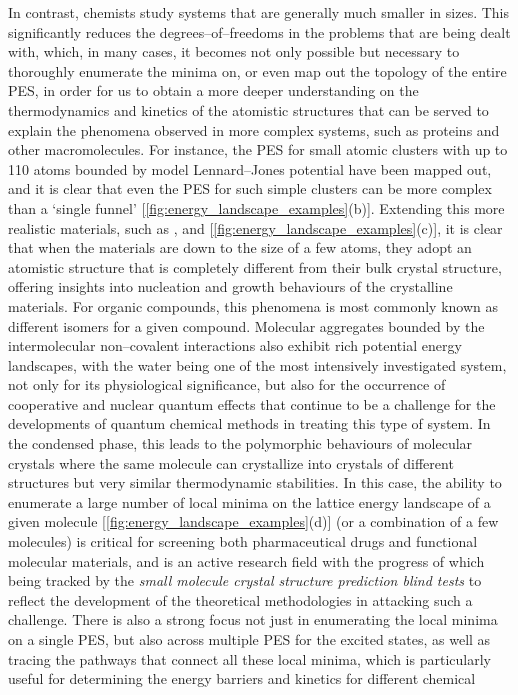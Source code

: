 In contrast, chemists study  systems that are generally much smaller in sizes. This significantly reduces the degrees--of--freedoms in the problems that are being dealt with, which, in many cases, it becomes not only possible but necessary to thoroughly enumerate the minima on, or even map out the topology of the entire PES, in order for us to obtain a more deeper understanding on the thermodynamics and kinetics of the atomistic structures that can be served to explain the phenomena observed in more complex systems, such as proteins and other macromolecules. For instance, the PES for small atomic clusters with up to 110 atoms  bounded by model Lennard--Jones potential have been mapped out,\cite{wales1997global} and it is clear that even the PES for such simple clusters can be more complex than a `single funnel' [\cref{fig:energy_landscape_examples}(b)].\cite{doye1999evolution} Extending this more realistic materials, such as \cite{roberts2001investigation}, \cite{hamad2005structure} and \cite{al2008structures} [\cref{fig:energy_landscape_examples}(c)], it is clear that when the materials are down to the size of a few atoms, they adopt an atomistic structure that is completely different from their bulk crystal structure, offering insights into nucleation and growth behaviours of the crystalline materials. For organic compounds, this phenomena is most commonly known as different isomers for a given compound. Molecular aggregates bounded by the intermolecular non--covalent interactions also exhibit rich potential energy landscapes, with the water\cite{wales1998global,engel2018mapping,monserrat2020liquid,reinhardt2021quantum} being one of the most intensively investigated system, not only for its physiological significance, but also for the occurrence of cooperative\cite{mahadevi2016cooperativity} and nuclear quantum effects\cite{ceriotti2016nuclear}  that continue to be a challenge for the developments of quantum chemical methods in treating this type of system.\cite{gillan2013energy,gillan2016perspective,yuan2017benchmark,manna2017conventional}  In the condensed phase, this leads to the  polymorphic behaviours of molecular crystals where the same molecule can crystallize into crystals of different structures but very similar thermodynamic stabilities.\cite{yu2010polymorphism,bauer2001ritonavir}  In this case, the ability to enumerate a large number of local minima on the lattice energy landscape of a given molecule [\cref{fig:energy_landscape_examples}(d)] (or a combination of a few molecules) is critical for screening  both pharmaceutical drugs and functional molecular materials,\cite{neumann2015combined,pulido2017functional} and is an active research field with the progress of which being tracked by the \emph{small molecule crystal structure prediction blind tests} to reflect the development of the theoretical methodologies in attacking such a challenge.\cite{reilly2016report,Hunnisett:aw5093,Hunnisett:aw5094} There is also a strong focus not just in enumerating the local minima on a single PES,  but also across multiple PES for the excited states, as well as tracing the pathways that connect all these local minima, which is particularly useful for determining the  energy barriers and kinetics for different chemical 